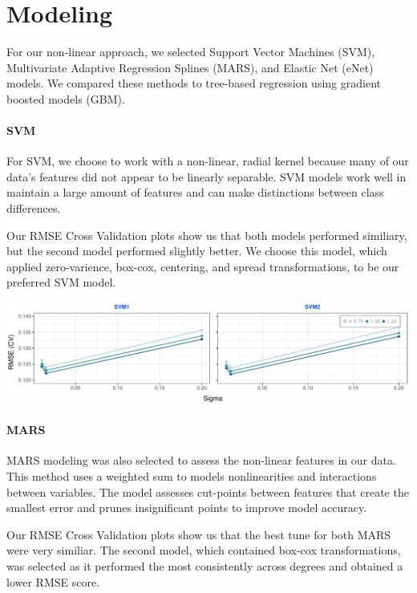 \documentclass[]{report}
\begin{document}
\hypertarget{modeling}{%
\chapter{Modeling}\label{modeling}}

For our non-linear approach, we selected Support Vector Machines (SVM),
Multivariate Adaptive Regression Splines (MARS), and Elastic Net (eNet)
models. We compared these methods to tree-based regression using
gradient boosted models (GBM).

\hypertarget{svm}{%
\subsubsection{SVM}\label{svm}}

For SVM, we choose to work with a non-linear, radial kernel because many
of our data's features did not appear to be linearly separable. SVM
models work well in maintain a large amount of features and can make
distinctions between class differences.

Our RMSE Cross Validation plots show us that both models performed
similiary, but the second model performed slightly better. We choose
this model, which applied zero-varience, box-cox, centering, and spread
transformations, to be our preferred SVM model.

\includegraphics{Proj2-JM_files/figure-latex/unnamed-chunk-7-1.pdf}

\hypertarget{mars}{%
\subsubsection{MARS}\label{mars}}

MARS modeling was also selected to assess the non-linear features in our
data. This method uses a weighted sum to models nonlinearities and
interactions between variables. The model assesses cut-points between
features that create the smallest error and prunes insignificant points
to improve model accuracy.

Our RMSE Cross Validation plots show us that the best tune for both MARS
were very similiar. The second model, which contained box-cox
transformations, was selected as it performed the most consistently
across degrees and obtained a lower RMSE score.
\end{document}
